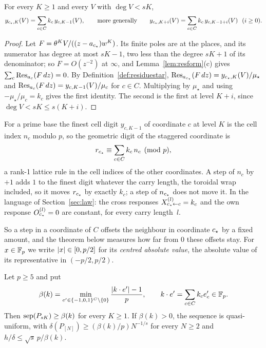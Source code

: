 \begin{lemma}\label{lem:residuestar-rel}
For every $K\ge1$ and every $V$ with $\deg V<sK$,
\[
y_{\cstar,K}(V)=\sum_{c\in C}k_c\,y_{c,K-1}(V),\qquad\text{more generally}\qquad y_{\cstar,K+i}(V)=\sum_{c\in C}k_c\,y_{c,K-1+i}(V)\ \ (i\ge0).
\]
\end{lemma}

\begin{proof}
Let $F=\theta^KV/((z-a_{c_{\star}})w^K)$. Its finite poles are at the places, and its numerator has degree at most $sK-1$, two less than the degree $sK+1$ of its denominator; so $F=O(z^{-2})$ at $\infty$, and Lemma~\ref{lem:resform}(c) gives $\sum_c\operatorname{Res}_{a_c}(F\,dz)=0$. By Definition~\ref{def:residuestar}, $\operatorname{Res}_{a_{c_{\star}}}(F\,dz)=y_{c_{\star},K}(V)/\mu_\star$ and $\operatorname{Res}_{a_c}(F\,dz)=y_{c,K-1}(V)/\mu_c$ for $c\in C$. Multiplying by $\mu_\star$ and using $-\mu_\star/\mu_c=k_c$ gives the first identity. The second is the first at level $K+i$, since $\deg V<sK\le s(K+i)$.
\end{proof}

For a prime base the finest cell digit $y_{c,K-1}$ of coordinate $c$ at level $K$ is the cell index $n_c$ modulo $p$, so the geometric digit of the staggered coordinate is
\[
r_{c_{\star}}\equiv\sum_{c\in C}k_c\,n_c\pmod p,
\]
a rank-1 lattice rule in the cell indices of the other coordinates. A step of $n_c$ by $+1$ adds $1$ to the finest digit whatever the carry length, the toroidal wrap included, so it moves $r_{c_{\star}}$ by exactly $k_c$; a step of $n_{c_{\star}}$ does not move it. In the language of Section~\ref{sec:law}: the cross responses $X^{(l)}_{c_{\star}\leftarrow c}=k_c$ and the own response $O^{(l)}_{c_{\star}}=0$ are constant, for every carry length~$l$.

So a step in a coordinate of $C$ offsets the neighbour in coordinate $c_{\star}$ by a fixed amount, and the theorem below measures how far from $0$ these offsets stay. For $x\in\mathbb{F}_p$ we write $\lvert x\rvert\in[0,p/2]$ for its \emph{centred absolute value}, the absolute value of its representative in $(-p/2,p/2)$.

\begin{theorem}\label{thm:residuestar}
Let $p\ge5$ and put
\[
\beta(k)=\min_{e'\in\{-1,0,1\}^{C}\setminus\{0\}}\frac{\lvert k\cdot e'\rvert-1}{p},\qquad k\cdot e'=\sum_{c\in C}k_ce'_c\in\mathbb{F}_p .
\]
Then $\operatorname{sep}(P_{sK})\ge\beta(k)$ for every $K\ge1$. If $\beta(k)>0$, the sequence is quasi-uniform, with $\delta(P_{[N]})\ge(\beta(k)/p)N^{-1/s}$ for every $N\ge2$ and $h/\delta\le\sqrt s\,p/\beta(k)$.
\end{theorem}

